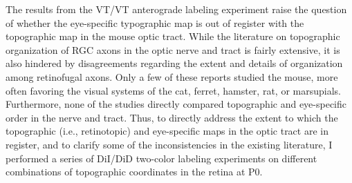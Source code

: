 The results from the VT/VT anterograde labeling experiment raise the question of whether the eye-specific typographic map is out of register with the topographic map in the mouse optic tract.
While the literature on topographic organization of RGC axons in the optic nerve and tract is fairly extensive, it is also hindered by disagreements regarding the extent and details of organization among retinofugal axons.
Only a few of these reports studied the mouse, more often favoring the visual systems of the cat, ferret, hamster, rat, or marsupials.
Furthermore, none of the studies directly compared topographic and eye-specific order in the nerve and tract.
Thus, to directly address the extent to which the topographic (i.e., retinotopic) and eye-specific maps in the optic tract are in register, and to clarify some of the inconsistencies in the existing literature, I performed a series of DiI/DiD two-color labeling experiments on different combinations of topographic coordinates in the retina at P0.

